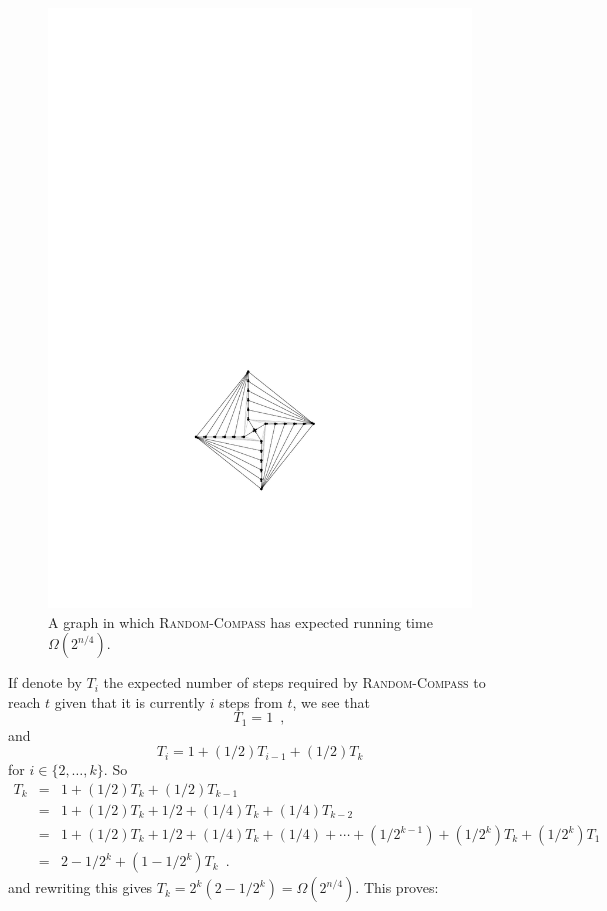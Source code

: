 \documentclass [letterpaper] {patmorin}
\begin{document}
\begin{figure}
  \begin{center}
    \includegraphics{pics/bad-unbiased}
  \end{center}
  \caption{A graph in which \textsc{Random-Compass} has expected running time 
           $\Omega(2^{n/4})$.}
  \label{fig:bad-unbiased}
\end{figure}

If denote by $T_i$ the expected number of steps required by \textsc{Random-Compass} to reach $t$ given that it is currently $i$ steps from $t$, we see that 
\[ 
   T_1=1 \enspace ,
\]
and 
\[
  T_i = 1 + (1/2)T_{i-1} + (1/2)T_k
\]
for $i \in \{2,\ldots, k\}$.  So 
\begin{eqnarray*}
  T_k & = & 1 + (1/2)T_k + (1/2)T_{k-1} \\
      & = & 1 + (1/2)T_k + 1/2 + (1/4)T_{k} + (1/4)T_{k-2} \\
      & = & 1 + (1/2)T_k + 1/2 + (1/4)T_{k} + (1/4)
              + \cdots  + (1/2^{k-1}) + (1/2^{k})T_{k} + (1/2^{k})T_1 \\
      & = & 2-1/2^{k} + (1-1/2^k)T_k \enspace .
\end{eqnarray*}
and rewriting this gives $T_k = 2^k(2-1/2^{k}) = \Omega(2^{n/4})$.  This proves:
\end{document}
